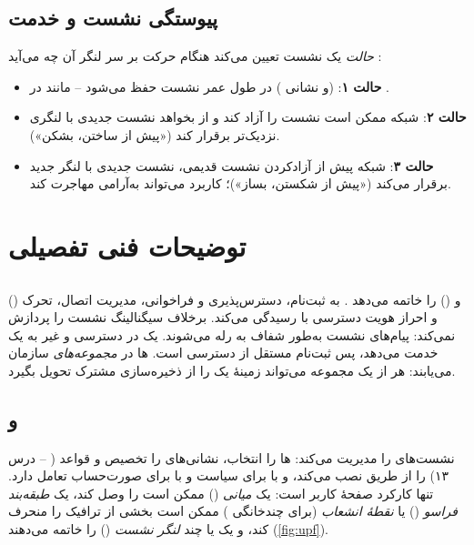 \documentclass[11pt,a4paper]{article}
\begin{document}
\subsection{پیوستگی نشست و خدمت}
\emph{حالت } یک نشست تعیین می‌کند هنگام حرکت  بر سر لنگر آن چه می‌آید \cite{ts23501}:
\begin{itemize}
  \item \textbf{حالت  ۱}:  (و نشانی ) در طول عمر نشست حفظ می‌شود -- مانند  در .
  \item \textbf{حالت  ۲}: شبکه ممکن است نشست را آزاد کند و از  بخواهد نشست جدیدی با لنگری نزدیک‌تر برقرار
        کند («پیش از ساختن، بشکن»).
  \item \textbf{حالت  ۳}: شبکه پیش از آزادکردن نشست قدیمی، نشست جدیدی با لنگر جدید برقرار می‌کند («پیش از شکستن، بساز»)؛
        کاربرد می‌تواند به‌آرامی مهاجرت کند.
\end{itemize}

\section{توضیحات فنی تفصیلی}

\subsection{}
  () و  () را خاتمه می‌دهد \cite{ts24501,ts38413}. به ثبت‌نام، دسترس‌پذیری و
فراخوانی، مدیریت اتصال، تحرک و احراز هویت دسترسی با  رسیدگی می‌کند. برخلاف  سیگنالینگ نشست را پردازش
نمی‌کند: پیام‌های  نشست به‌طور شفاف به  رله می‌شوند. یک  در دسترسی  و غیر
به یک  خدمت می‌دهد، پس ثبت‌نام مستقل از دسترسی است. ها در \emph{مجموعه‌های } سازمان می‌یابند: هر
 از یک مجموعه می‌تواند زمینهٔ یک  را از ذخیره‌سازی مشترک تحویل بگیرد.

\subsection{ و }
 نشست‌های  را مدیریت می‌کند: ها را انتخاب، نشانی‌های  را تخصیص و قواعد 
( -- درس ۱۳) را از طریق  نصب می‌کند، و با  برای سیاست و با  برای
صورت‌حساب تعامل دارد.  تنها کارکرد صفحهٔ کاربر است: یک \emph{ میانی} () ممکن است  را وصل
کند، یک \emph{طبقه‌بند فراسو} () یا \emph{نقطهٔ انشعاب} (برای چندخانگی ) ممکن است بخشی از ترافیک را منحرف
کند، و یک یا چند \emph{لنگر نشست } ()  را خاتمه می‌دهند (\cref{fig:upf}).
\end{document}
